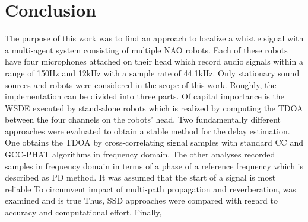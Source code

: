\chapter{Conclusion}
\label{chap:05_conclusion}

\begin{comment}
    - Objective of this work:
        x a whistle sound locator (in xy-plane) with multiple robots
        x stationary robots and sources
        x evaluated different tdoa methods
        - found a approach to detect direction of source on single robots
\end{comment}

The purpose of this work was to find an approach to localize a whistle
signal with a multi-agent system consisting of multiple NAO robots.
Each of these robots have four microphones attached on their head which
record audio signals within a range of 150\si{\hertz} and 12\si{\kilo\hertz}
with a sample rate of 44.1\si{\kilo\hertz}.
Only stationary sound sources and robots were considered in the scope of this
work.
Roughly, the implementation can be divided into three parts.
Of capital importance is the \acf{WSDE} executed by stand-alone robots which
is realized by computing the \ac{TDOA} between the four channels on the robots' head.
Two fundamentally different approaches were evaluated to obtain a stable method
for the delay estimation.
One obtains the \ac{TDOA} by cross-correlating signal samples with standard
\acf{CC} and \acf{GCC-PHAT} algorithms in frequency domain.
The other analyses recorded samples in frequency domain in terms of
a phase of a reference frequency which is described as \acf{PD} method.
It was assumed that the start of a signal is most reliable 
To circumvent impact of multi-path propagation and reverberation, 
was examined and is true
Thus, \acf{SSD} approaches were compared with regard to accuracy and computational effort.
Finally, 






